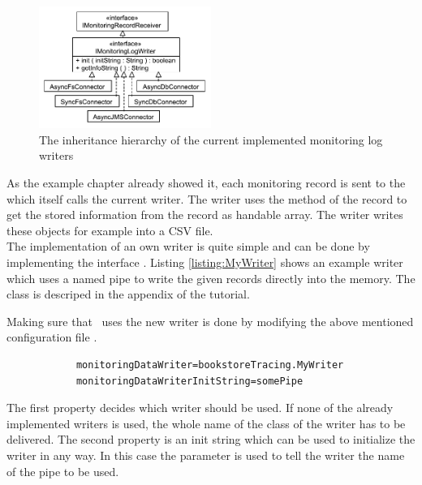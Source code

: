 		\begin{figure}[H]
			\begin{centering}
				\includegraphics[width=0.5\textwidth]{images/kieker_writerimpls}
				\caption{The inheritance hierarchy of the current implemented monitoring log writers}
				\label{figure:monitoringLogWritersHierarchy}
			\end{centering}
		\end{figure}


		\noindent As the example chapter already showed it, each monitoring record is sent to the  which itself calls the current writer. The writer uses the  method of the record to get the stored information from the record as handable array. The writer writes these objects for example into a CSV file.\\
		The implementation of an own writer is quite simple and can be done by implementing the interface . Listing \ref{listing:MyWriter} shows an example writer which uses a named pipe to write the given records directly into the memory. The class  is descriped in the appendix of the tutorial. 

		\setJavaCodeListing
		

		\noindent Making sure that \Kieker\  uses the new writer is done by modifying the above mentioned configuration file \dir{\monitoringPropertiesFile}.

		\setBashListing       
		\begin{lstlisting}
			monitoringDataWriter=bookstoreTracing.MyWriter
			monitoringDataWriterInitString=somePipe
		\end{lstlisting}

		\noindent The first property decides which writer should be used. If none of the already implemented writers is used, the whole name of the class of the writer has to be delivered. The second property is an init string which can be used to initialize the writer in any way. In this case the parameter is used to tell the writer the name of the pipe to be used.\\
